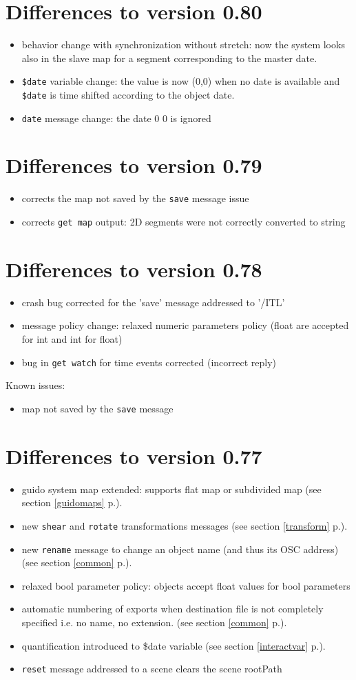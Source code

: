 \documentclass[a4paper,twoside]{report}
\newcommand{\sublevel}[1]	{\section{#1}}
\newcommand{\fullref}[1]	{\ref{#1} p.\pageref{#1}}
\newcommand{\OSC}[1]		{\texttt{#1}}
\begin{document}
\sublevel{Differences to version 0.80}
\begin{itemize}
\item behavior change with synchronization without stretch: now the system looks also in the
  slave map for a segment corresponding to the master date.
\item \OSC{\$date} variable change: the value is now (0,0) when no date is available and \OSC{\$date} is time shifted according to the object date.
\item \OSC{date} message change: the date 0 0 is ignored
\end{itemize}


\sublevel{Differences to version 0.79}
\begin{itemize}
\item corrects the map not saved by the \OSC{save} message issue
\item corrects \OSC{get map} output: 2D segments were not correctly converted to string
\end{itemize}

\sublevel{Differences to version 0.78}
\begin{itemize}
\item crash bug corrected for the 'save' message addressed to '/ITL'
\item message policy change: relaxed numeric parameters policy (float are accepted for int and int for float)
\item bug in \OSC{get watch} for time events corrected (incorrect reply)
\end{itemize}
Known issues:
\begin{itemize}
\item map not saved by the \OSC{save} message 
\end{itemize}

\sublevel{Differences to version 0.77}
\begin{itemize}
\item guido system map extended: supports flat map or subdivided map (see section \fullref{guidomaps}).
\item new \OSC{shear} and \OSC{rotate} transformations messages (see section \fullref{transform}).
\item new \OSC{rename} message to change an object name (and thus its OSC address) (see section \fullref{common}).
\item relaxed bool parameter policy: objects accept float values for bool parameters 
\item automatic numbering of exports when destination file is not completely specified 
  i.e. no name, no extension. (see section \fullref{common}).
\item quantification introduced to \$date variable (see section \fullref{interactvar}).
\item \OSC{reset} message addressed to a scene clears the scene rootPath
\end{itemize}
\end{document}

